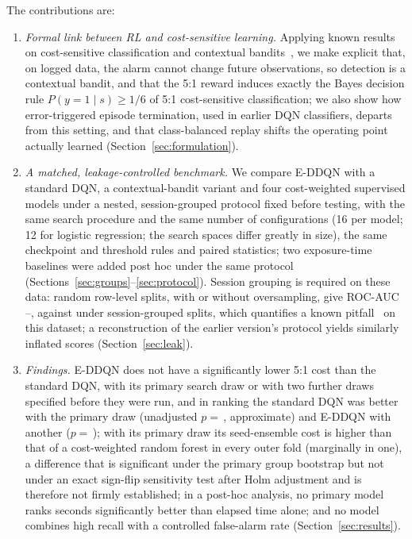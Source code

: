 The contributions are:
\begin{enumerate}
\item \emph{Formal link between RL and cost-sensitive learning.} Applying known results on cost-sensitive classification and contextual bandits~\cite{elkan2001cost,dudik2011efficient}, we make explicit that, on logged data, the alarm cannot change future observations, so detection is a contextual bandit, and that the 5:1 reward induces exactly the Bayes decision rule $P(y=1\mid s)\ge1/6$ of 5:1 cost-sensitive classification; we also show how error-triggered episode termination, used in earlier DQN classifiers, departs from this setting, and that class-balanced replay shifts the operating point actually learned (Section~\ref{sec:formulation}).
\item \emph{A matched, leakage-controlled benchmark.} We compare E-DDQN with a standard DQN, a contextual-bandit variant and four cost-weighted supervised models under a nested, session-grouped protocol fixed before testing, with the same search procedure and the same number of configurations (16 per model; 12 for logistic regression; the search spaces differ greatly in size), the same checkpoint and threshold rules and paired statistics; two exposure-time baselines were added post hoc under the same protocol (Sections~\ref{sec:groups}--\ref{sec:protocol}). Session grouping is required on these data: random row-level splits, with or without oversampling, give ROC-AUC \LeakRowRocAuc--\LeakOldRocAuc, against \LeakGrpRocAuc{} under session-grouped splits, which quantifies a known pitfall~\cite{kapoor2023leakage,kaufman2012leakage} on this dataset; a reconstruction of the earlier version's protocol yields similarly inflated scores (Section~\ref{sec:leak}).
\item \emph{Findings.} E-DDQN does not have a significantly lower 5:1 cost than the standard DQN, with its primary search draw or with two further draws specified before they were run, and in ranking the standard DQN was better with the primary draw (unadjusted $p=$\,\SDPairOneAucP, approximate) and E-DDQN with another ($p=$\,\SDPairTwoAucP); with its primary draw its seed-ensemble cost is higher than that of a cost-weighted random forest in every outer fold (marginally in one), a difference that is significant under the primary group bootstrap but not under an exact sign-flip sensitivity test after Holm adjustment and is therefore not firmly established; in a post-hoc analysis, no primary model ranks seconds significantly better than elapsed time alone; and no model combines high recall with a controlled false-alarm rate (Section~\ref{sec:results}).

\end{enumerate}
